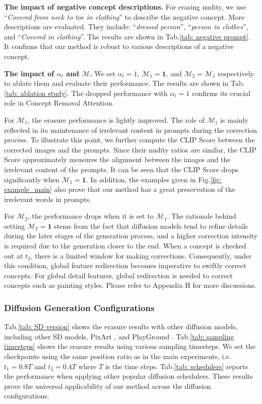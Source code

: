 \textbf{The impact of negative concept descriptions.} For erasing nudity, we use ``\textit{Covered from neck to toe in clothing}'' to describe the negative concept. More descriptions are evaluated. They include: ``\textit{dressed person}'', ``\textit{person in clothes}'', and ``\textit{Covered in clothing}''. The results are shown in Tab.\ref{tab: negative prompt}. It confirms that our method is robust to various descriptions of a negative concept.

\textbf{The impact of $\alpha_t$ and $\mathcal{M}$.} We set $\alpha_t=1$, $\mathcal{M}_1=\mathbf{1}$, and $\mathcal{M}_2=\mathcal{M}_1$ respectively to ablate them and evaluate their performance. The results are shown in Tab.\ref{tab: ablation study}. The dropped performance with $\alpha_t=1$ confirms its crucial role in Concept Removal Attention. 

For $\mathcal{M}_1$, the erasure performance is lightly improved. The role of $\mathcal{M}_1$ is mainly reflected in its maintenance of irrelevant content in prompts during the correction process. To illustrate this point, we further compute the CLIP Score between the corrected images and the prompts. Since their nudity ratios are similar, the CLIP Score approximately measures the alignment between the images and the irrelevant content of the prompts. It can be seen that the CLIP Score drops significantly when $\mathcal{M}_1=\mathbf{1}$. In addition, the examples given in Fig.\ref{fig: example_main} also prove that our method has a great preservation of the irrelevant words in prompts. 

For $\mathcal{M}_2$, the performance drops when it is set to $\mathcal{M}_1$. The rationale behind setting $\mathcal{M}_2=\mathbf{1}$ stems from the fact that diffusion models tend to refine details during the later stages of the generation process, and a higher correction intensity is required due to the generation closer to the end. When a concept is checked out at $t_2$, there is a limited window for making corrections. Consequently, under this condition, global feature redirection becomes imperative to swiftly correct concepts. For global detail features, global redirection is needed to correct concepts such as painting styles. Please refer to Appendix H for more discussions.

\subsubsection{Diffusion Generation Configurations}
Tab.\ref{tab: SD version} shows the erasure results with other diffusion models, including other SD models, PixArt \cite{chenpixart}, and PlayGround \cite{li2024playground}. Tab.\ref{tab: sampling timesteps} shows the erasure results using various sampling timesteps. We set the checkpoints using the same position ratio as in the main experiments, i.e. $t_1=0.8T$ and $t_2=0.4T$ where $T$ is the time steps. Tab.\ref{tab: schedulers} reports the performance when applying other popular diffusion schedulers. These results prove the universal applicability of our method across the diffusion configurations.

